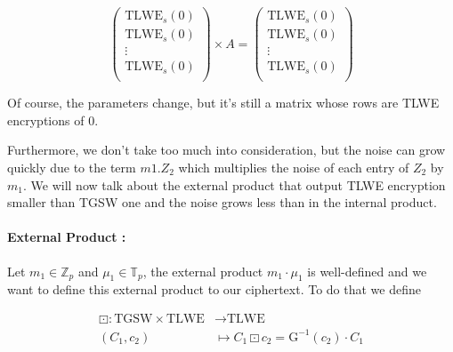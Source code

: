 \documentclass{article}
\newcommand{\Z}{\mathbb{Z}}
\newcommand{\T}{\mathbb{T}}
\theoremstyle{definition}
\theoremstyle{Theorem}
\begin{document}
$$\begin{pmatrix}
    \text{TLWE}_s(0)\\
    \text{TLWE}_s(0)\\
    \vdots\\
    \text{TLWE}_s(0)\\
    \end{pmatrix}
    \times A = \begin{pmatrix}
    \text{TLWE}_s(0)\\
    \text{TLWE}_s(0)\\
    \vdots\\
    \text{TLWE}_s(0)\\
    \end{pmatrix}$$

Of course, the parameters change, but it's still a matrix whose rows are TLWE encryptions of $0$.

Furthermore, we don't take too much into consideration, but the noise can grow quickly due to the term $m1.Z_2$ which multiplies the noise of each entry of $Z_2$ by $m_1$. We will now talk about the external product that output TLWE encryption smaller than TGSW one and the noise grows less than in the internal product. 

\paragraph{External Product :}
Let $m_1\in\Z_p$ and $\mu_1\in\T_p$, the external product $m_1\cdot\mu_1$ is well-defined and we want to define this external product to our ciphertext. To do that we define 

\begin{align}
    \boxdot \colon \text{TGSW} \times \text{TLWE} &\to \text{TLWE}\\
      (C_1,c_2) &\mapsto C_1\boxdot c_2 = \text{G}^{-1}(c_2)\cdot C_1
\end{align}
\end{document}
